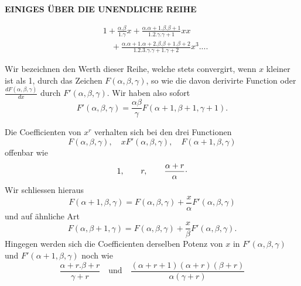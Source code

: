 \begingroup
\makeatletter\tagsleft@true\let\veqno\@@leqno\makeatother
\clearpage\NoSourceHead{}
\begin{center}\large\bfseries EINIGES ÜBER DIE UNENDLICHE REIHE\end{center}
\[\begin{aligned}
&1+\frac{\alpha{.}\beta}{1{.}\gamma}x+\frac{\alpha{.}\alpha+1{.}\beta{.}\beta+1}{1{.}2{.}\gamma{.}\gamma+1}xx\\[.5em]
&\quad+\frac{\alpha{.}\alpha+1{.}\alpha+2{.}\beta{.}\beta+1{.}\beta+2}{1{.}2{.}3{.}\gamma{.}\gamma+1{.}\gamma+2}x^3{.}{.}{.}{.}
\end{aligned}\]
\noindent{\small[S. 36]}\par
\par\indent Wir bezeichnen den Werth dieser Reihe, welche stets convergirt, wenn $x$ kleiner ist als 1, durch das Zeichen $F(\alpha,\beta,\gamma)$, so wie die davon derivirte Function oder $\frac{dF(\alpha,\beta,\gamma)}{dx}$ durch $F'(\alpha,\beta,\gamma)$. Wir haben also sofort
\begin{equation}
F'(\alpha,\beta,\gamma)=\frac{\alpha\beta}{\gamma}F(\alpha+1,\beta+1,\gamma+1).\tag*{(1)}
\end{equation}
\par\indent Die Coefficienten von $x^r$ verhalten sich bei den drei Functionen
\[F(\alpha,\beta,\gamma),\quad xF'(\alpha,\beta,\gamma),\quad F(\alpha+1,\beta,\gamma)\]
\noindent offenbar wie
\[1,\qquad r,\qquad \frac{\alpha+r}{\alpha}\mathpunct{\raisebox{.45ex}{.}}\]
\noindent Wir schliessen hieraus
\begin{equation}
F(\alpha+1,\beta,\gamma)=F(\alpha,\beta,\gamma)+\frac{x}{\alpha}F'(\alpha,\beta,\gamma)\tag*{(2)}
\end{equation}
\noindent und auf ähnliche Art
\begin{equation}
F(\alpha,\beta+1,\gamma)=F(\alpha,\beta,\gamma)+\frac{x}{\beta}F'(\alpha,\beta,\gamma).\tag*{(3)}
\end{equation}
\clearpage{}
\noindent Hingegen werden sich die Coefficienten derselben Potenz von $x$ in $F'(\alpha,\beta,\gamma)$ und $F'(\alpha+1,\beta,\gamma)$ noch wie
\[\frac{\alpha+r{.}\beta+r}{\gamma+r}\quad\text{und}\quad\frac{(\alpha+r+1)(\alpha+r)(\beta+r)}{\alpha(\gamma+r)}\]
